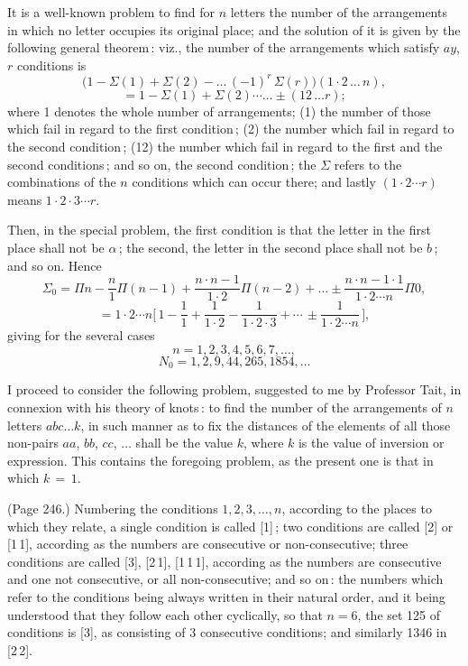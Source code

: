 \documentclass[11pt,a4paper]{book}
\begin{document}
\medskip

\noindent It is a well-known problem to find for $n$ letters the number of the arrangements in which no letter occupies its original place; and the solution of it is given by the following general theorem\,: viz., the number of the arrangements which satisfy $a y$, $r$ conditions is
\[
( 1 - \Sigma(1) + \Sigma(2) - \ldots\,(- 1)^r\,\Sigma(r)\big) (1\cdot 2\,\ldots\,n),
\]
\[
= 1 - \Sigma(1) + \Sigma(2) \cdots\ldots \pm(12\,\ldots r);
\]
where 1 denotes the whole number of arrangements; (1) the number of those which fail in regard to the first condition\,; (2) the number which fail in regard to the second condition\,; (12) the number which fail in regard to the first and the second conditions\,; and so on, the second condition\,; the $\Sigma$ refers to the combinations of the $n$ conditions which can occur there; and lastly $(1\cdot 2\cdots r)$ means $1\cdot 2\cdot 3\cdots r$.

Then, in the special problem, the first condition is that the letter in the first place shall not be $\alpha$\,; the second, the letter in the second place shall not be $b$\,; and so on. Hence
\[
\Sigma_0 = \Pi n - \frac{n}{1}\Pi(n - 1) + \frac{n\cdot n - 1}{1\cdot 2}\Pi(n - 2) + \ldots \pm \frac{n\cdot n - 1\cdot 1}{1\cdot 2\cdots n}\Pi 0,
\]
\[
= 1\cdot 2\cdots n\Big[\,1 - \frac{1}{1} + \frac{1}{1\cdot 2} - \frac{1}{1\cdot 2\cdot 3} + \cdots\,\pm \frac{1}{1\cdot 2\cdots n}\,\Big],
\]
giving for the several cases
\[
n = 1, 2, 3, 4, 5, 6, 7, \ldots,
\]
\[
N_0 = 1, 2, 9, 44, 265, 1854, \ldots
\]

I proceed to consider the following problem, suggested to me by Professor Tait, in connexion with his theory of knots\,: to find the number of the arrangements of $n$ letters $abc\ldots k$, in such manner as to fix the distances of the elements of all those non-pairs $aa$, $bb$, $cc$, $\ldots$ shall be the value $k$, where $k$ is the value of inversion or expression. This contains the foregoing problem, as the present one is that in which $k\,=\,1$.

\medskip

\noindent (Page 246.) Numbering the conditions $1, 2, 3, \ldots, n$, according to the places to which they relate, a single condition is called [1]\,; two conditions are called [2] or [1\,1], according as the numbers are consecutive or non-consecutive; three conditions are called [3], [2\,1], [1\,1\,1], according as the numbers are consecutive and one not consecutive, or all non-consecutive; and so on\,: the numbers which refer to the conditions being always written in their natural order, and it being understood that they follow each other cyclically, so that $n = 6$, the set 125 of conditions is [3], as consisting of 3 consecutive conditions; and similarly 1346 in [2\,2].
\end{document}
